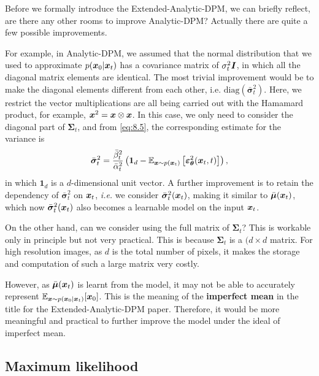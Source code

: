 Before we formally introduce the Extended-Analytic-DPM, we can briefly reflect, are there any other rooms to improve Analytic-DPM? Actually there are quite a few possible improvements.

For example, in Analytic-DPM, we assumed that the normal distribution that we used to approximate $p(\bm{x}_0|\bm{x}_{t})$ has a covariance matrix of $\sigma_t^2\bm{I}$, in which all the diagonal matrix elements are identical. The most trivial improvement would be to make the diagonal elements different from each other, i.e. $\mbox{diag}(\bar{\bm{\sigma}}_t^2)$. Here, we restrict the vector multiplications are all being carried out with the Hamamard product, for example, $\bm{x}^2=\bm{x}\otimes\bm{x}$. In this case, we only need to consider the diagonal part of $\bm{\Sigma}_t$, and from \cref{eq:8.5}, the corresponding estimate for the variance is
\begin{equation}
    \label{eq:8.6}
    \bar{\bm{\sigma}}_t^2=\frac{\bar{\beta}_t^2}{\bar{\alpha}_t^2}\left(\bm{1}_d-\mathbb{E}_{\bm{x}\sim p(\bm{x}_{t})}\left[\bm{\varepsilon}_{\bm{\theta}}^2(\bm{x}_{t},t) \right]\right),
\end{equation}
in which $\bm{1}_d$ is a $d$-dimensional unit vector. A further improvement is to retain the dependency of $\bar{\bm{\sigma}}_t^2$ on $\bm{x}_{t}$, \emph{i.e.} we consider $\bar{\bm{\sigma}}_t^2(\bm{x}_{t})$, making it similar to $\bar{\bm{\mu}}(\bm{x}_{t})$, which now $\bar{\bm{\sigma}}_t^2(\bm{x}_{t})$ also becomes a learnable model on the input $\bm{x}_{t}$.

On the other hand, can we consider using the full matrix of $\bm{\Sigma}_t$? This is workable only in principle but not very practical. This is because $\bm{\Sigma}_t$ is a $(d\times d$ matrix. For high resolution images, as $d$ is the total number of pixels, it makes the storage and computation of such a large matrix very costly.

However, as $\bar{\bm{\mu}}(\bm{x}_{t})$ is learnt from the model, it may not be able to accurately  represent $\mathbb{E}_{\bm{x}\sim p(\bm{x}_0|\bm{x}_{t})}[\bm{x}_0]$. This is the meaning of the \textbf{imperfect mean} in the title for the Extended-Analytic-DPM paper. Therefore, it would be more meaningful and practical to further improve the model under the ideal of imperfect mean.

\subsection{Maximum likelihood}


